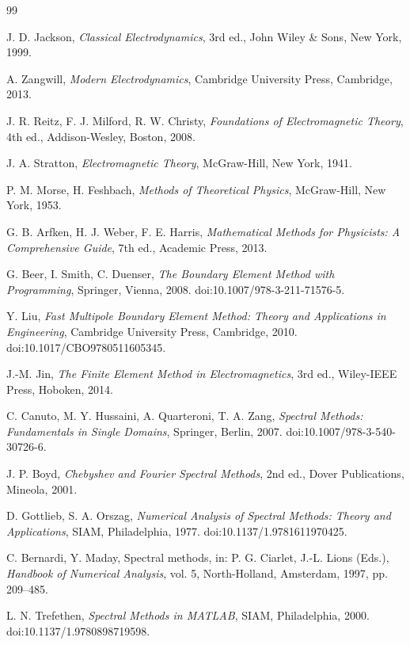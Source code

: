\documentclass[preprint,12pt]{elsarticle}
\begin{document}
\begin{thebibliography}{99}

J. D. Jackson, \textit{Classical Electrodynamics}, 3rd ed., John Wiley \& Sons, New York, 1999.

A. Zangwill, \textit{Modern Electrodynamics}, Cambridge University Press, Cambridge, 2013.

J. R. Reitz, F. J. Milford, R. W. Christy, \textit{Foundations of Electromagnetic Theory}, 4th ed., Addison-Wesley, Boston, 2008.

J. A. Stratton, \textit{Electromagnetic Theory}, McGraw-Hill, New York, 1941.

P. M. Morse, H. Feshbach, \textit{Methods of Theoretical Physics}, McGraw-Hill, New York, 1953.

G. B. Arfken, H. J. Weber, F. E. Harris, \textit{Mathematical Methods for Physicists: A Comprehensive Guide}, 7th ed., Academic Press, 2013.

G. Beer, I. Smith, C. Duenser, \textit{The Boundary Element Method with Programming}, Springer, Vienna, 2008. doi:10.1007/978-3-211-71576-5.

Y. Liu, \textit{Fast Multipole Boundary Element Method: Theory and Applications in Engineering}, Cambridge University Press, Cambridge, 2010. doi:10.1017/CBO9780511605345.

J.-M. Jin, \textit{The Finite Element Method in Electromagnetics}, 3rd ed., Wiley-IEEE Press, Hoboken, 2014.

C. Canuto, M. Y. Hussaini, A. Quarteroni, T. A. Zang, \textit{Spectral Methods: Fundamentals in Single Domains}, Springer, Berlin, 2007. doi:10.1007/978-3-540-30726-6.

J. P. Boyd, \textit{Chebyshev and Fourier Spectral Methods}, 2nd ed., Dover Publications, Mineola, 2001.

D. Gottlieb, S. A. Orszag, \textit{Numerical Analysis of Spectral Methods: Theory and Applications}, SIAM, Philadelphia, 1977. doi:10.1137/1.9781611970425.

C. Bernardi, Y. Maday, Spectral methods, in: P. G. Ciarlet, J.-L. Lions (Eds.), \textit{Handbook of Numerical Analysis}, vol. 5, North-Holland, Amsterdam, 1997, pp. 209--485.

L. N. Trefethen, \textit{Spectral Methods in MATLAB}, SIAM, Philadelphia, 2000. doi:10.1137/1.9780898719598.


\end{thebibliography}
\end{document}
